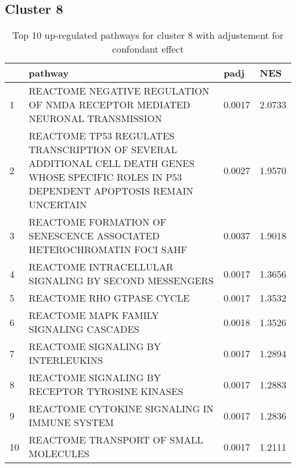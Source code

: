 \documentclass{article}
\begin{document}
\subsection{Cluster 8 }
\begin{table}[H]
\centering
\begin{tabular}{p{0.05\linewidth}p{0.7\linewidth}p{0.1\linewidth}p{0.1\linewidth}}
  \hline
 & pathway & padj & NES \\ 
  \hline
1 & REACTOME NEGATIVE REGULATION OF NMDA RECEPTOR MEDIATED NEURONAL TRANSMISSION & 0.0017 & 2.0733 \\ 
  2 & REACTOME TP53 REGULATES TRANSCRIPTION OF SEVERAL ADDITIONAL CELL DEATH GENES WHOSE SPECIFIC ROLES IN P53 DEPENDENT APOPTOSIS REMAIN UNCERTAIN & 0.0027 & 1.9570 \\ 
  3 & REACTOME FORMATION OF SENESCENCE ASSOCIATED HETEROCHROMATIN FOCI SAHF & 0.0037 & 1.9018 \\ 
  4 & REACTOME INTRACELLULAR SIGNALING BY SECOND MESSENGERS & 0.0017 & 1.3656 \\ 
  5 & REACTOME RHO GTPASE CYCLE & 0.0017 & 1.3532 \\ 
  6 & REACTOME MAPK FAMILY SIGNALING CASCADES & 0.0018 & 1.3526 \\ 
  7 & REACTOME SIGNALING BY INTERLEUKINS & 0.0017 & 1.2894 \\ 
  8 & REACTOME SIGNALING BY RECEPTOR TYROSINE KINASES & 0.0017 & 1.2883 \\ 
  9 & REACTOME CYTOKINE SIGNALING IN IMMUNE SYSTEM & 0.0017 & 1.2836 \\ 
  10 & REACTOME TRANSPORT OF SMALL MOLECULES & 0.0017 & 1.2111 \\ 
   \hline
\end{tabular}
\caption{Top 10 up-regulated pathways for cluster 8 with adjustement for confondant effect} 
\label{tab:q3_2_conf_8}
\end{table}
\end{document}
